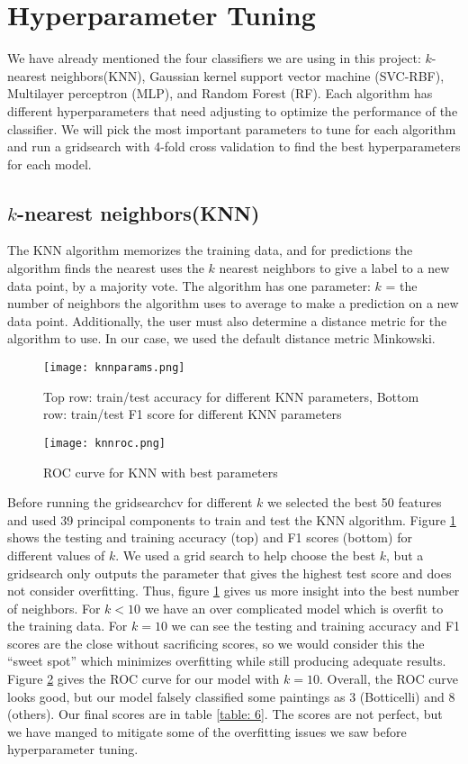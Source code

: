 \documentclass[12pt]{article}
\begin{document}
\section{Hyperparameter Tuning}

We have already mentioned the four classifiers we are using in this project: $k$-nearest neighbors(KNN), Gaussian kernel support vector machine (SVC-RBF), Multilayer perceptron (MLP), and Random Forest (RF). Each algorithm has different hyperparameters that need adjusting to optimize the performance of the classifier. We will pick the most important parameters to tune for each algorithm and run a gridsearch with 4-fold cross validation to find the best hyperparameters for each model.

\subsection{$k$-nearest neighbors(KNN)}

The KNN algorithm memorizes the training data, and for predictions the algorithm finds the nearest uses the $ k $ nearest neighbors to give a label to a new data point, by a majority vote. The algorithm has one parameter: $k$ = the number of neighbors the algorithm uses to average to make a prediction on a new data point. Additionally, the user must also determine a distance metric for the algorithm to use. In our case, we used the default distance metric Minkowski. 
\begin{figure}[h]
	\centering
	\texttt{[image: knnparams.png]}
	\caption{Top row: train/test accuracy for different KNN parameters, Bottom row: train/test F1 score for different KNN parameters}
	\label{knnparams}
\end{figure}

\begin{figure}[h]
	\centering
	\texttt{[image: knnroc.png]}
	\caption{ROC curve for KNN with best parameters}
	\label{knnroc}
\end{figure}
Before running the gridsearchcv for different $k$ we selected the best 50 features and used 39 principal components to train and test the KNN algorithm. Figure \ref{knnparams} shows the testing and training accuracy (top) and F1 scores (bottom) for different values of $k$. We used a grid search to help choose the best $k$, but a gridsearch only outputs the parameter that gives the highest test score and does not consider overfitting. Thus, figure \ref{knnparams} gives us more insight into the best number of neighbors. For $k<10$ we have an over complicated model which is overfit to the training data. For $k=10$ we can see the testing and training accuracy and F1 scores are the close without sacrificing scores, so we would consider this the ``sweet spot'' which minimizes overfitting while still producing adequate results. Figure \ref{knnroc} gives the ROC curve for our model with $k=10$. Overall, the ROC curve looks good, but our model falsely classified some paintings as 3 (Botticelli) and 8 (others). Our final scores are in table \ref{table: 6}. The scores are not perfect, but we have manged to mitigate some of the overfitting issues we saw before hyperparameter tuning.
\end{document}
